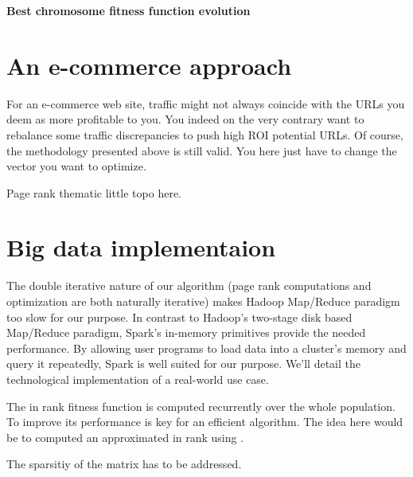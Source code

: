 \documentclass{iSWAGArticle}
\begin{document}
\begin{center}
\textbf{\large Best chromosome fitness function evolution}
\end{center}
\begin{center}
\end{center}

\section{An e-commerce approach}
For an e-commerce web site, traffic might not always coincide with the URLs you deem as more profitable to you.
You indeed on the very contrary want to rebalance some traffic discrepancies to push high ROI potential URLs.
Of course, the methodology presented above is still valid. You here just have to change the vector you want to
optimize.


Page rank thematic little topo here.

\section{Big data implementaion}
The double iterative nature of our algorithm (page rank computations and optimization are both naturally iterative)
makes Hadoop Map/Reduce paradigm too slow for our purpose. 
In contrast to Hadoop's two-stage disk based Map/Reduce paradigm, Spark's in-memory primitives provide the needed performance.
By allowing user programs to load data into a cluster's memory and query it repeatedly, Spark is well suited for our purpose.
We'll detail the technological implementation of a real-world use case.



The in rank fitness function is computed recurrently over the whole population. To improve its performance is key for an efficient
algorithm. The idea here would be to computed an approximated in rank using \cite{}.

The sparsitiy of the matrix has to be addressed.





\end{document}
